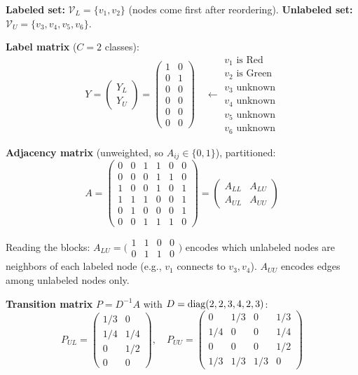 \begin{notechapter}
\begin{numericalexample}[title=Label Matrix and Partitioning on a 6-Node Graph]
\textbf{Labeled set:} $\mathcal{V}_L = \{v_1, v_2\}$ (nodes come first after
reordering). \textbf{Unlabeled set:} $\mathcal{V}_U = \{v_3, v_4, v_5, v_6\}$.

\textbf{Label matrix} ($C = 2$ classes):
\[
Y = \begin{pmatrix} Y_L \\ \hline Y_U \end{pmatrix}
= \left(\begin{array}{cc} 1 & 0 \\ 0 & 1 \\ \hline 0 & 0 \\ 0 & 0 \\
0 & 0 \\ 0 & 0 \end{array}\right)
\quad \leftarrow \begin{array}{l} v_1 \text{ is Red} \\ v_2 \text{ is Green} \\
v_3 \text{ unknown} \\ v_4 \text{ unknown} \\ v_5 \text{ unknown} \\
v_6 \text{ unknown} \end{array}
\]

\textbf{Adjacency matrix} (unweighted, so $A_{ij} \in \{0,1\}$), partitioned:
\[
A = \left(\begin{array}{cc|cccc}
0 & 0 & 1 & 1 & 0 & 0 \\
0 & 0 & 0 & 1 & 1 & 0 \\
\hline
1 & 0 & 0 & 1 & 0 & 1 \\
1 & 1 & 1 & 0 & 0 & 1 \\
0 & 1 & 0 & 0 & 0 & 1 \\
0 & 0 & 1 & 1 & 1 & 0
\end{array}\right)
= \begin{pmatrix} A_{LL} & A_{LU} \\ A_{UL} & A_{UU} \end{pmatrix}
\]

Reading the blocks: $A_{LU} = \bigl(\begin{smallmatrix} 1&1&0&0 \\ 0&1&1&0
\end{smallmatrix}\bigr)$ encodes which unlabeled nodes are neighbors of each
labeled node (e.g., $v_1$ connects to $v_3, v_4$). $A_{UU}$ encodes edges
among unlabeled nodes only.

\textbf{Transition matrix} $P = D^{-1}A$ with $D = \operatorname{diag}(2, 2, 3, 4, 2, 3)$:
\[
P_{UL} = \begin{pmatrix} 1/3 & 0 \\ 1/4 & 1/4 \\ 0 & 1/2 \\ 0 & 0 \end{pmatrix},
\quad
P_{UU} = \begin{pmatrix} 0 & 1/3 & 0 & 1/3 \\ 1/4 & 0 & 0 & 1/4 \\
0 & 0 & 0 & 1/2 \\ 1/3 & 1/3 & 1/3 & 0 \end{pmatrix}
\]


\end{numericalexample}
\end{notechapter}
